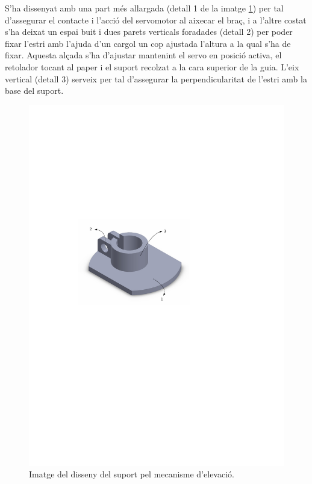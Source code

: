 S’ha dissenyat amb una part més allargada (detall 1 de la imatge \ref{fig:suport}) per tal d’assegurar el contacte i l’acció del servomotor al aixecar el braç, i a l'altre costat s’ha deixat un espai buit i dues parets verticals foradades (detall 2) per poder fixar l’estri amb l’ajuda d’un cargol un cop ajustada l'altura a la qual s'ha de fixar. Aquesta alçada s'ha d'ajustar mantenint el servo en posició activa, el retolador tocant al paper i el suport recolzat a la cara superior de la guia. L’eix vertical (detall 3) serveix per tal d’assegurar la perpendicularitat de l’estri amb la base del suport. 

\begin{figure}[H]
	\centering
	\includegraphics{suport}
	\caption{Imatge del disseny del suport pel mecanisme d'elevació.}
	\label{fig:suport}
\end{figure}

